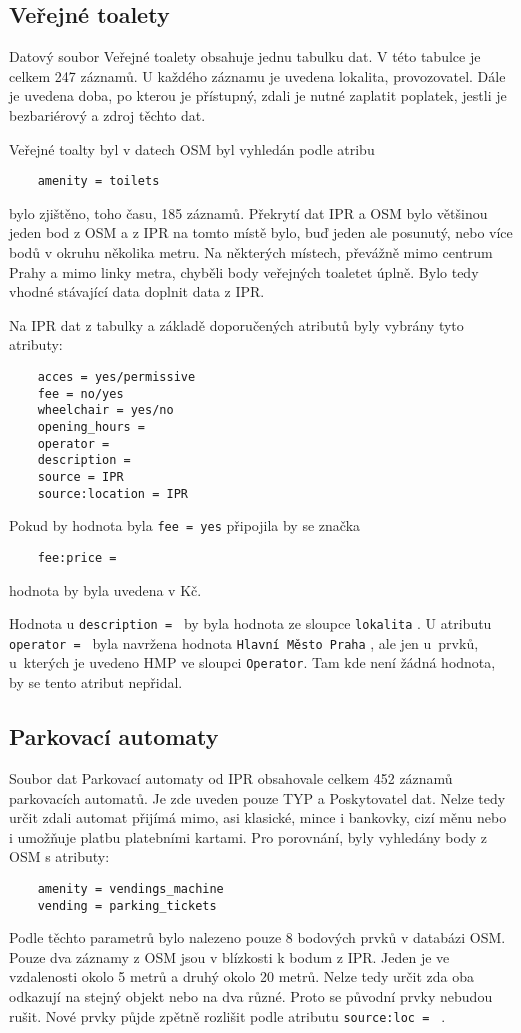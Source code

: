 \subsection{Veřejné toalety}
\label{Veřejné toalety}
Datový soubor Veřejné toalety obsahuje jednu tabulku dat. V této tabulce je 
celkem 247 záznamů. U každého záznamu je uvedena lokalita, provozovatel. 
Dále je uvedena doba, po kterou je přístupný, zdali je nutné zaplatit poplatek,
jestli je bezbariérový a zdroj těchto dat.

Veřejné toalty byl v datech OSM byl vyhledán podle atribu
\begin{verbatim}
    amenity = toilets
\end{verbatim}

bylo zjištěno, toho času, 185 záznamů. Překrytí dat IPR a OSM bylo většinou
jeden bod z OSM a z IPR na tomto místě bylo, buď jeden ale posunutý, nebo
více bodů v okruhu několika metru. Na některých místech, převážně mimo centrum
Prahy a mimo linky metra, chyběli body veřejných toaletet úplně.
Bylo tedy vhodné stávající data doplnit data z IPR.

Na IPR dat z tabulky a základě doporučených atributů byly vybrány tyto atributy:
\begin{verbatim}
    acces = yes/permissive
    fee = no/yes
    wheelchair = yes/no
    opening_hours =
    operator =
    description =
    source = IPR
    source:location = IPR
\end{verbatim}
Pokud by hodnota byla {\tt fee~=~yes} připojila by se značka
\begin{verbatim}
    fee:price =
\end{verbatim}
hodnota by byla uvedena v Kč.

Hodnota u {\tt description~= } by byla hodnota ze sloupce {\tt lokalita} .
U atributu {\tt operator~= } byla navržena hodnota {\tt Hlavní Město Praha} ,
ale jen u~prvků, u~kterých je uvedeno HMP ve sloupci {\tt Operator}.
Tam kde není žádná hodnota, by se tento atribut nepřidal.


\subsection{Parkovací automaty}
\label{Parkovací automaty}
Soubor dat Parkovací automaty od IPR obsahovale celkem 452 záznamů parkovacích
automatů. Je zde uveden pouze TYP a Poskytovatel dat. Nelze tedy určit zdali
automat přijímá mimo, asi klasické, mince i bankovky, cizí měnu nebo i umožňuje
platbu platebními kartami.
Pro porovnání, byly vyhledány body z OSM s atributy:
\begin{verbatim}
    amenity = vendings_machine
    vending = parking_tickets
\end{verbatim}
Podle těchto parametrů bylo nalezeno pouze 8 bodových prvků v databázi OSM.
Pouze dva záznamy z OSM jsou v blízkosti k bodum z IPR.
Jeden je ve vzdalenosti okolo 5 metrů a druhý okolo 20 metrů. Nelze tedy určit
zda oba odkazují na stejný objekt nebo na dva různé.
Proto se původní prvky nebudou rušit. Nové prvky půjde zpětně rozlišit podle
atributu {\tt source:loc~= } .

